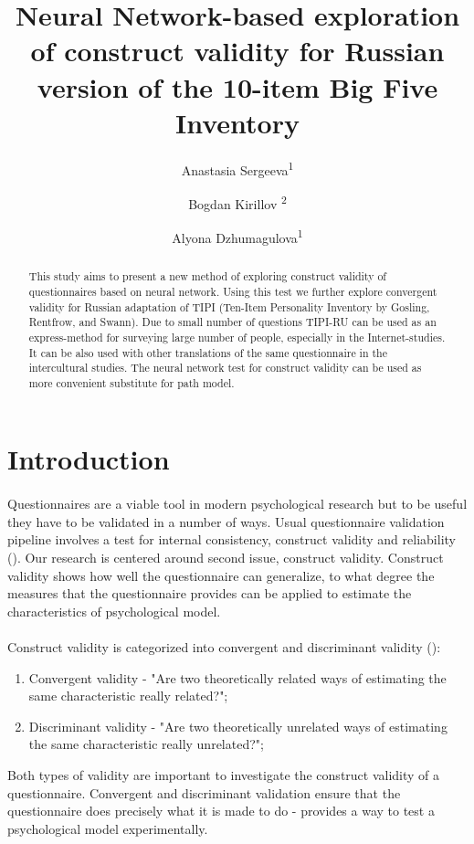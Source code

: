 \documentclass{llncs}
\begin{document}
\title{Neural Network-based exploration of construct validity for Russian version of the 10-item Big Five Inventory}
\author{Anastasia Sergeeva\textsuperscript{1} \and Bogdan Kirillov \textsuperscript{2} \and Alyona Dzhumagulova\textsuperscript{1}}
\maketitle

\begin{abstract}

This study aims to present a new method of exploring construct validity of questionnaires based on neural network. Using this test we further explore convergent validity for Russian adaptation of TIPI (Ten-Item Personality Inventory by Gosling, Rentfrow, and Swann). Due to small number of questions TIPI-RU can be used as an express-method for surveying large number of people, especially in the Internet-studies. It can be also used with other translations of the same questionnaire in the intercultural studies. The neural network test for construct validity can be used as more convenient substitute for path model.

\end{abstract}

\section{Introduction}\label{sec:Introduction}

\paragraph{}
Questionnaires are a viable tool in modern psychological research but to be useful they have to be validated in a number of ways. Usual questionnaire validation pipeline involves a test for internal consistency, construct validity and reliability (\cite{furr2017psychometrics}). Our research is centered around second issue, construct validity. Construct validity shows how well the questionnaire can generalize, to what degree the measures that the questionnaire provides can be applied to estimate the characteristics of psychological model.
\paragraph{}
Construct validity is categorized into convergent and discriminant validity (\cite{campbell1959convergent}):
	\begin{enumerate}
		\item Convergent validity - "Are two theoretically related ways of estimating the same characteristic really related?";
		\item Discriminant validity - "Are two theoretically unrelated ways of estimating the same characteristic really unrelated?"; 
	\end{enumerate}
Both types of validity are important to investigate the construct validity of a questionnaire. Convergent and discriminant validation ensure that the questionnaire does precisely what it is made to do - provides a way to test a psychological model experimentally.
\end{document}
